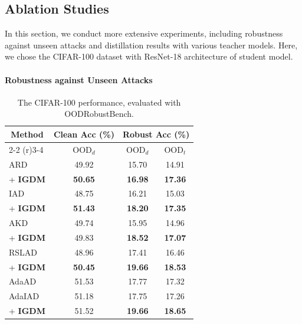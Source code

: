 \documentclass{article} %
\begin{document}
\subsection{Ablation Studies}
In this section, we conduct more extensive experiments, including robustness against unseen attacks and distillation results with various teacher models.
Here, we chose the CIFAR-100 dataset with ResNet-18 architecture of student model.


 
\paragraph{Robustness against Unseen Attacks}
\begin{table}
 \centering
 \caption{The CIFAR-100 performance, evaluated with OODRobustBench.}
    \setlength{\tabcolsep}{3pt}
 \begin{tabular}{lccc}
  \toprule
\multicolumn{1}{c}{\multirow{2}{*}{Method}} &Clean Acc (\%)&\multicolumn{2}{c}{Robust Acc (\%)}\\ 
\cmidrule(r){2-2} 
\cmidrule(r){3-4} 
& \multicolumn{1}{c}{$\text{OOD}_d$} & $\text{OOD}_d$ & $\text{OOD}_t$ \\
\midrule
 ARD & 49.92 & 15.70 & 14.91 \\
 + \textbf{IGDM} & \textbf{50.65} & \textbf{16.98} & \textbf{17.36} \\
 \midrule
 IAD & 48.75 & 16.21 & 15.03 \\
 + \textbf{IGDM} & \textbf{51.43} & \textbf{18.20} & \textbf{17.35} \\
  \midrule
 AKD & 49.74 & 15.95 & 14.96 \\
 + \textbf{IGDM} & 49.83 & \textbf{18.52} & \textbf{17.07} \\
   \midrule
  RSLAD & 48.96 & 17.41 & 16.46 \\
 + \textbf{IGDM} & \textbf{50.45} & \textbf{19.66} & \textbf{18.53} \\
   \midrule
   AdaAD & 51.53 & 17.77 & 17.32 \\
  AdaIAD & 51.18  & 17.75 & 17.26 \\
   +  \textbf{IGDM} & 51.52  & \textbf{19.66} & \textbf{18.65} \\
 \bottomrule
 \end{tabular}
 \label{tab:unseen attack}
\end{table}
\end{document}
